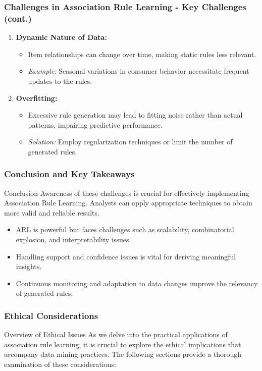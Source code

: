 \documentclass[aspectratio=169]{beamer}
\begin{document}
\begin{frame}[fragile]
    \frametitle{Challenges in Association Rule Learning - Key Challenges (cont.)}
    \begin{enumerate}[resume]
        \item \textbf{Dynamic Nature of Data:}
        \begin{itemize}
            \item Item relationships can change over time, making static rules less relevant.
            \item \textit{Example:} Seasonal variations in consumer behavior necessitate frequent updates to the rules.
        \end{itemize}
        
        \item \textbf{Overfitting:}
        \begin{itemize}
            \item Excessive rule generation may lead to fitting noise rather than actual patterns, impairing predictive performance.
            \item \textit{Solution:} Employ regularization techniques or limit the number of generated rules.
        \end{itemize}
    \end{enumerate}
\end{frame}

\begin{frame}[fragile]
    \frametitle{Conclusion and Key Takeaways}
    \begin{block}{Conclusion}
        Awareness of these challenges is crucial for effectively implementing Association Rule Learning. Analysts can apply appropriate techniques to obtain more valid and reliable results.
    \end{block}
    \begin{itemize}
        \item ARL is powerful but faces challenges such as scalability, combinatorial explosion, and interpretability issues.
        \item Handling support and confidence issues is vital for deriving meaningful insights.
        \item Continuous monitoring and adaptation to data changes improve the relevancy of generated rules.
    \end{itemize}
\end{frame}

\begin{frame}[fragile]
    \frametitle{Ethical Considerations}
    \begin{block}{Overview of Ethical Issues}
        As we delve into the practical applications of association rule learning, it is crucial to explore the ethical implications that accompany data mining practices. The following sections provide a thorough examination of these considerations:
    \end{block}
\end{frame}
\end{document}
